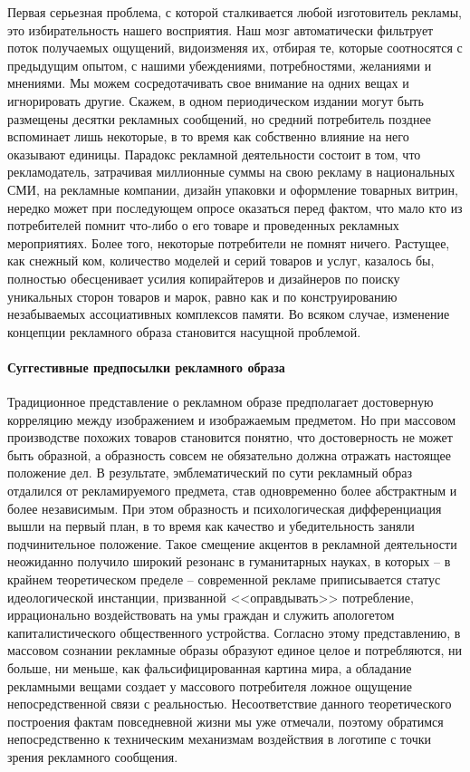 Первая серьезная проблема, с которой сталкивается любой изготовитель рекламы,
это избирательность нашего восприятия. Наш мозг автоматически фильтрует поток
получаемых ощущений, видоизменяя их, отбирая те, которые соотносятся с
предыдущим опытом, с нашими убеждениями, потребностями, желаниями и мнениями.
Мы можем сосредотачивать свое внимание на одних вещах и игнорировать другие.
Скажем, в одном периодическом издании могут быть размещены десятки  рекламных
сообщений, но средний потребитель позднее вспоминает лишь некоторые, в то время
как собственно влияние на него оказывают единицы. Парадокс рекламной
деятельности состоит в том, что рекламодатель, затрачивая миллионные суммы на
свою рекламу в национальных СМИ, на рекламные компании, дизайн упаковки и
оформление товарных витрин, нередко может при последующем опросе оказаться
перед фактом, что мало кто из потребителей помнит что-либо о его товаре и
проведенных рекламных мероприятиях. Более того, некоторые потребители не помнят
ничего. Растущее, как снежный ком, количество моделей и серий товаров и услуг,
казалось бы,  полностью обесценивает усилия копирайтеров и дизайнеров по поиску
уникальных сторон товаров и марок, равно как и  по конструированию незабываемых
ассоциативных комплексов памяти. Во всяком случае, изменение концепции
рекламного образа становится насущной проблемой.

\paragraph{Суггестивные предпосылки рекламного образа}
Традиционное представление о рекламном образе предполагает достоверную
корреляцию между изображением и изображаемым предметом. Но при массовом
производстве похожих товаров становится понятно, что достоверность не может
быть образной, а образность совсем не обязательно должна отражать настоящее
положение дел. В результате, эмблематический по сути рекламный образ отдалился
от рекламируемого предмета, став  одновременно более абстрактным и более
независимым. При этом образность и психологическая дифференциация вышли на
первый план, в то время как качество и убедительность заняли подчинительное
положение. Такое смещение акцентов в рекламной деятельности неожиданно получило
широкий резонанс в гуманитарных науках, в которых -- в крайнем теоретическом
пределе -- современной рекламе приписывается статус идеологической инстанции,
призванной <<оправдывать>> потребление, иррационально воздействовать на умы
граждан и служить апологетом капиталистического общественного устройства.
Согласно этому представлению, в массовом сознании рекламные образы образуют
единое целое и потребляются, ни больше, ни меньше, как фальсифицированная
картина мира, а обладание рекламными вещами создает у массового потребителя
ложное ощущение непосредственной связи с реальностью\autocite[][190-191]{bodriyar1999sistema}.
Несоответствие данного теоретического построения фактам повседневной жизни мы
уже отмечали,  поэтому обратимся непосредственно к техническим механизмам
воздействия в логотипе с точки зрения рекламного сообщения.

